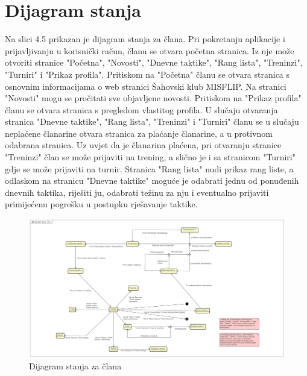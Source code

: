 		\section{Dijagram stanja}
			
			Na slici 4.5 prikazan je dijagram stanja za člana. Pri pokretanju aplikacije i prijavljivanju u korisnički račun, članu se otvara početna stranica. Iz nje može otvoriti stranice "Početna",  "Novosti", "Dnevne taktike", "Rang lista", "Treninzi", "Turniri" i "Prikaz profila". Pritiskom na "Početna" članu se otvara stranica s osnovnim informacijama o web stranici Šahovski klub MISFLIP. Na stranici "Novosti" mogu se pročitati sve objavljene novosti. Pritiskom na "Prikaz profila" članu se otvara stranica s pregledom vlastitog profila. U slučaju otvaranja stranica "Dnevne taktike", "Rang lista", "Treninzi" i "Turniri" članu se u slučaju neplaćene članarine otvara stranica za plaćanje članarine, a u protivnom odabrana stranica. Uz uvjet da je članarina plaćena, pri otvaranju stranice "Treninzi" član se može prijaviti na trening, a slično je i sa stranicom "Turniri" gdje se može prijaviti na turnir. Stranica "Rang lista" nudi prikaz rang liste, a odlaskom na stranicu "Dnevne taktike" moguće je odabrati jednu od ponuđenih dnevnih taktika, riješiti ju, odabrati težinu za nju i eventualno prijaviti primijećenu pogrešku u postupku rješavanje taktike.
				
			
			
			\begin{figure}[H]
				\centerfloat
				\includegraphics[scale=0.21]{dijagrami/dijagramstanjaclan2.jpg} %
				\caption{Dijagram stanja za člana}
				\label{fig:UC9}
			\end{figure}
			
			\eject
			
